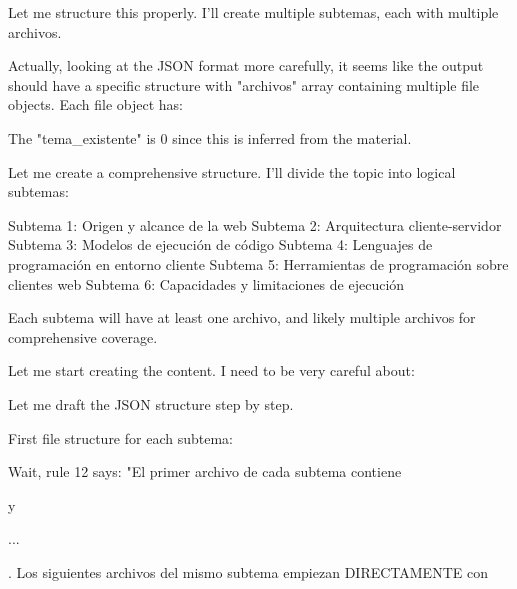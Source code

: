 {

Let me structure this properly. I'll create multiple subtemas, each with multiple archivos.

Actually, looking at the JSON format more carefully, it seems like the output should have a specific structure with "archivos" array containing multiple file objects. Each file object has:

The "tema\_existente" is 0 since this is inferred from the material.

Let me create a comprehensive structure. I'll divide the topic into logical subtemas:

Subtema 1: Origen y alcance de la web
Subtema 2: Arquitectura cliente-servidor  
Subtema 3: Modelos de ejecución de código
Subtema 4: Lenguajes de programación en entorno cliente
Subtema 5: Herramientas de programación sobre clientes web
Subtema 6: Capacidades y limitaciones de ejecución

Each subtema will have at least one archivo, and likely multiple archivos for comprehensive coverage.

Let me start creating the content. I need to be very careful about:

Let me draft the JSON structure step by step.

First file structure for each subtema:

Wait, rule 12 says: "El primer archivo de cada subtema contiene 

y 

...

. Los siguientes archivos del mismo subtema empiezan DIRECTAMENTE con}
